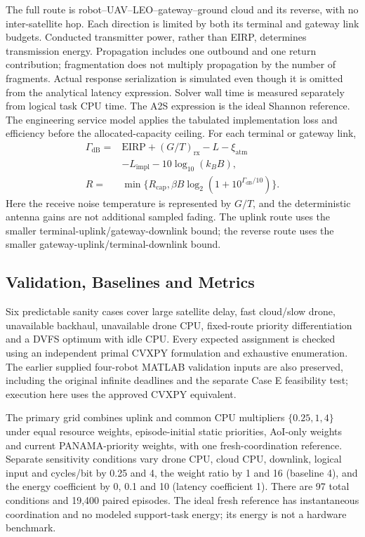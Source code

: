 The full route is robot--UAV--LEO--gateway--ground cloud and its reverse, with no inter-satellite hop. Each direction is limited by both its terminal and gateway link budgets. Conducted transmitter power, rather than EIRP, determines transmission energy. Propagation includes one outbound and one return contribution; fragmentation does not multiply propagation by the number of fragments. Actual response serialization is simulated even though it is omitted from the analytical latency expression. Solver wall time is measured separately from logical task CPU time.
The A2S expression is the ideal Shannon reference. The engineering service model applies the tabulated implementation loss and efficiency before the allocated-capacity ceiling. For each terminal or gateway link,
\begin{align}
 \Gamma_{\mathrm{dB}}={}&\mathrm{EIRP}+(G/T)_{\mathrm{rx}}-L-\xi_{\mathrm{atm}}\nonumber\\
 &-L_{\mathrm{impl}}-10\log_{10}(k_B B),\\
 R={}&\min\{R_{\mathrm{cap}},\beta B\log_2(1+10^{\Gamma_{\mathrm{dB}}/10})\}.
\end{align}
Here the receive noise temperature is represented by $G/T$, and the deterministic antenna gains are not additional sampled fading. The uplink route uses the smaller terminal-uplink/gateway-downlink bound; the reverse route uses the smaller gateway-uplink/terminal-downlink bound.

\subsection{Validation, Baselines and Metrics}
Six predictable sanity cases cover large satellite delay, fast cloud/slow drone, unavailable backhaul, unavailable drone CPU, fixed-route priority differentiation and a DVFS optimum with idle CPU. Every expected assignment is checked using an independent primal CVXPY formulation and exhaustive enumeration. The earlier supplied four-robot MATLAB validation inputs are also preserved, including the original infinite deadlines and the separate Case E feasibility test; execution here uses the approved CVXPY equivalent.

The primary grid combines uplink and common CPU multipliers $\{0.25,1,4\}$ under equal resource weights, episode-initial static priorities, AoI-only weights and current PANAMA-priority weights, with one fresh-coordination reference. Separate sensitivity conditions vary drone CPU, cloud CPU, downlink, logical input and cycles/bit by 0.25 and 4, the weight ratio by 1 and 16 (baseline 4), and the energy coefficient by 0, 0.1 and 10 (latency coefficient 1). There are 97 total conditions and 19,400 paired episodes. The ideal fresh reference has instantaneous coordination and no modeled support-task energy; its energy is not a hardware benchmark.

